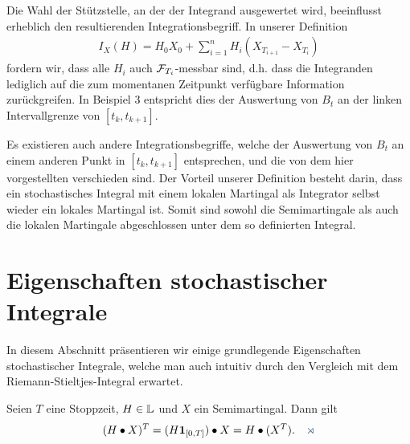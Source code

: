 \begin{rem*}
Die Wahl der Stützstelle, an der der Integrand ausgewertet wird, beeinflusst
erheblich den resultierenden Integrationsbegriff. In unserer Definition
\begin{align*}
I_X(H) = H_0 X_0 + \sum_{i=1}^n H_i(X_{T_{i+1}}-X_{T_i})
\end{align*} 
fordern wir, dass alle $H_i$ auch $\mathcal{F}_{T_i}$-messbar sind, d.h. dass die
Integranden lediglich auf die zum momentanen Zeitpunkt verfügbare Information
zurückgreifen.
In Beispiel 3 entspricht dies der Auswertung von $B_t$ an der
linken Intervallgrenze von $[t_k,t_{k+1}]$.

Es existieren auch andere Integrationsbegriffe, welche der Auswertung von $B_t$
an einem anderen Punkt in $[t_k,t_{k+1}]$ entsprechen, und die von dem hier
vorgestellten verschieden sind. Der Vorteil unserer Definition besteht darin,
dass ein stochastisches Integral mit einem lokalen Martingal als Integrator
selbst wieder ein lokales Martingal ist. Somit sind sowohl die Semimartingale
als auch die lokalen Martingale abgeschlossen unter dem so definierten
Integral.\map
\end{rem*}


\section{Eigenschaften stochastischer Integrale}

In diesem Abschnitt präsentieren wir einige grundlegende Eigenschaften
stochastischer Integrale, welche man auch intuitiv durch den Vergleich
mit dem Riemann-Stieltjes-Integral erwartet.

\begin{prop}
\label{prop:2.10}
Seien $T$ eine Stoppzeit, $H\in\mathbb{L}$ und $X$ ein Semimartingal. Dann gilt
\begin{align*}
(H\bullet X)^T = (H\Id_{[0,T]}) \bullet X = H\bullet (X^T).\fish
\end{align*}
\end{prop}


